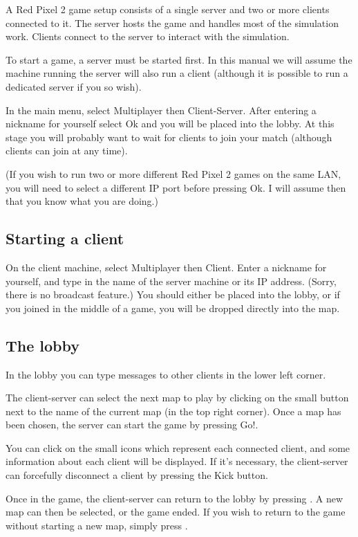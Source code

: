 \documentclass[a4paper,titlepage]{article}
\begin{document}
A Red Pixel 2 game setup consists of a single server and two or more
clients connected to it.  The server hosts the game and handles most
of the simulation work.  Clients connect to the server to interact
with the simulation.

To start a game, a server must be started first.  In this manual we
will assume the machine running the server will also run a client
(although it is possible to run a dedicated server if you so wish).

In the main menu, select \textsf{Multiplayer} then
\textsf{Client-Server}.  After entering a nickname for yourself select
\textsf{Ok} and you will be placed into the lobby.  At this stage you
will probably want to wait for clients to join your match (although
clients can join at any time).

(If you wish to run two or more different Red Pixel 2 games on the
same LAN, you will need to select a different IP port before pressing
\textsf{Ok}.  I will assume then that you know what you are doing.)


\subsection{Starting a client}

On the client machine, select \textsf{Multiplayer} then
\textsf{Client}.  Enter a nickname for yourself, and type in the name
of the server machine or its IP address.  (Sorry, there is no
broadcast feature.)  You should either be placed into the lobby, or if
you joined in the middle of a game, you will be dropped directly into
the map.


\subsection{The lobby}

In the lobby you can type messages to other clients in the lower left
corner.

The client-server can select the next map to play by clicking on the
small button next to the name of the current map (in the top right
corner).  Once a map has been chosen, the server can start the game by
pressing \textsf{Go!}.

You can click on the small icons which represent each connected
client, and some information about each client will be displayed.  If
it's necessary, the client-server can forcefully disconnect a client
by pressing the \textsf{Kick} button.

Once in the game, the client-server can return to the lobby by
pressing .  A new map can then be selected, or the game
ended.  If you wish to return to the game without starting a new map,
simply press .
\end{document}
